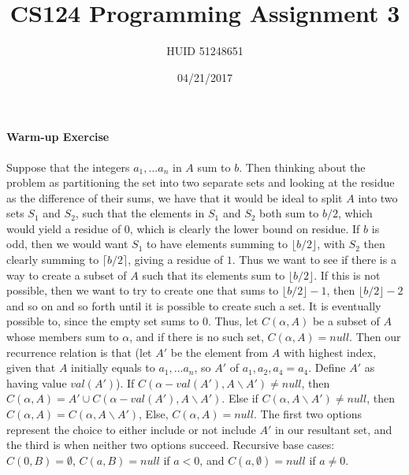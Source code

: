 \documentclass[10.5pt,letter]{article}
\begin{document}


\title{CS124 Programming Assignment 3}

\author{HUID 51248651}

\date{04/21/2017}
 
\maketitle 
	
\paragraph{Warm-up Exercise} Suppose that the integers $a_1, ... a_n$ in $A$ sum to $b$. Then thinking about the problem as partitioning the set into two separate sets and looking at the residue as the difference of their sums, we have that it would be ideal to split $A$ into two sets $S_1$ and $S_2$, such that the elements in $S_1$ and $S_2$ both sum to $b/2$, which would yield a residue of $0$, which is clearly the lower bound on residue. If $b$ is odd, then we would want $S_1$ to have elements summing to $\lfloor b/2 \rfloor$, with $S_2$ then clearly summing to $\lceil b/2\rceil$, giving a residue of $1$. Thus we want to see if there is a way to create a subset of $A$ such that its elements sum to $\lfloor b/2 \rfloor$. If this is not possible, then we want to try to create one that sums to $\lfloor b/2 \rfloor -1$, then $\lfloor b/2\rfloor -2$ and so on and so forth until it is possible to create such a set. It is eventually possible to, since the empty set sums to $0$. Thus, let $C(\alpha, A)$ be a subset of $A$ whose members sum to $\alpha$, and if there is no such set, $C(\alpha, A) = null$. Then our recurrence relation is that (let $A'$ be the element from $A$ with highest index, given that $A$ initially equals to $a_1, ... a_n$, so $A'$ of $a_1, a_2, a_4 = a_4$. Define $A'$ as having value $val(A')$). If $C(\alpha-val(A'), A\backslash A') \neq null$, then $C(\alpha, A) = A' \cup C(\alpha-val(A'), A\backslash A')$. Else if $C(\alpha, A \backslash A') \neq null$, then $C(\alpha, A) = C(\alpha, A \backslash A') $, Else, $C(\alpha, A) = null$. The first two options represent the choice to either include or not include $A'$ in our resultant set, and the third is when neither two options succeed. Recursive base cases: $C(0, B) = \emptyset$, $C(a, B) = null$ if $a < 0$, and $C(a, \emptyset) = null$ if $a \neq 0$.
\end{document}
